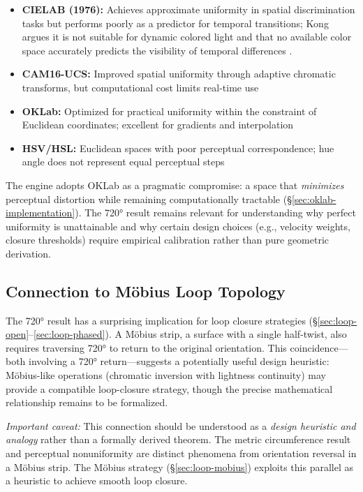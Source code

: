 \begin{itemize}
    \item \textbf{CIELAB (1976):} Achieves approximate uniformity in spatial discrimination tasks but performs poorly as a predictor for temporal transitions; Kong argues it is not suitable for dynamic colored light and that no available color space accurately predicts the visibility of temporal differences \citep[p.~3]{kong2021}.
    
    \item \textbf{CAM16-UCS:} Improved spatial uniformity through adaptive chromatic transforms, but computational cost limits real-time use
    
    \item \textbf{OKLab:} Optimized for practical uniformity within the constraint of Euclidean coordinates; excellent for gradients and interpolation
    
    \item \textbf{HSV/HSL:} Euclidean spaces with poor perceptual correspondence; hue angle does not represent equal perceptual steps
\end{itemize}

The engine adopts OKLab as a pragmatic compromise: a space that \emph{minimizes} perceptual distortion while remaining computationally tractable (\S\ref{sec:oklab-implementation}). The 720° result remains relevant for understanding why perfect uniformity is unattainable and why certain design choices (e.g., velocity weights, closure thresholds) require empirical calibration rather than pure geometric derivation.

\subsection{Connection to Möbius Loop Topology}

The 720° result has a surprising implication for loop closure strategies (\S\ref{sec:loop-open}--\ref{sec:loop-phased}). A Möbius strip, a surface with a single half-twist, also requires traversing 720° to return to the original orientation. This coincidence—both involving a 720° return—suggests a potentially useful design heuristic: Möbius-like operations (chromatic inversion with lightness continuity) may provide a compatible loop-closure strategy, though the precise mathematical relationship remains to be formalized.

\emph{Important caveat:} This connection should be understood as a \emph{design heuristic and analogy} rather than a formally derived theorem. The metric circumference result and perceptual nonuniformity are distinct phenomena from orientation reversal in a Möbius strip. The Möbius strategy (\S\ref{sec:loop-mobius}) exploits this parallel as a heuristic to achieve smooth loop closure.

